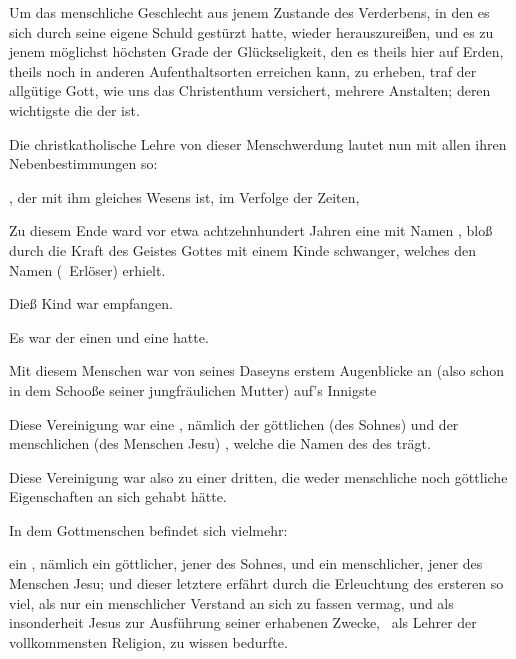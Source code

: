 Um das menschliche Geschlecht aus jenem Zustande des Verderbens, in den es sich durch seine eigene Schuld gestürzt hatte, wieder herauszureißen, und es zu jenem möglichst höchsten Grade der Glückseligkeit, den es theils hier auf Erden, theils noch in anderen Aufenthaltsorten erreichen kann, zu erheben, traf der allgütige Gott, wie uns das Christenthum versichert, mehrere Anstalten; deren wichtigste die der  ist.\par
Die christkatholische Lehre von dieser Menschwerdung lautet nun mit allen ihren Nebenbestimmungen so:
\begin{aufza} 
\item {}, der mit ihm gleiches Wesens ist, im Verfolge der Zeiten, 
\item Zu diesem Ende ward vor etwa achtzehnhundert Jahren eine  mit Namen , bloß durch die Kraft des Geistes Gottes mit einem Kinde schwanger, welches den Namen  (\dh\ Erlöser) erhielt.
\item Dieß Kind war  empfangen.
\item Es war  der einen  und eine  hatte.
\item Mit diesem Menschen war  von seines Daseyns erstem Augenblicke an (also schon in dem Schooße seiner jungfräulichen Mutter) auf's Innigste 
\item Diese Vereinigung war eine , nämlich der göttlichen (des Sohnes) und der menschlichen (des Menschen Jesu) , welche die Namen des  des  trägt.~
\item Diese Vereinigung war also  zu einer dritten, die weder menschliche noch göttliche Eigenschaften an sich gehabt hätte.
\item In dem Gottmenschen befindet sich vielmehr:
\begin{aufzb}
\item ein , nämlich ein göttlicher, jener des Sohnes, und ein menschlicher, jener des Menschen Jesu; und dieser letztere erfährt durch die Erleuchtung des ersteren so viel, als nur ein menschlicher Verstand an sich zu fassen vermag, und als insonderheit Jesus zur Ausführung seiner erhabenen Zwecke, \zB\ als Lehrer der vollkommensten Religion, zu wissen bedurfte.

\end{aufzb}
\end{aufza}
